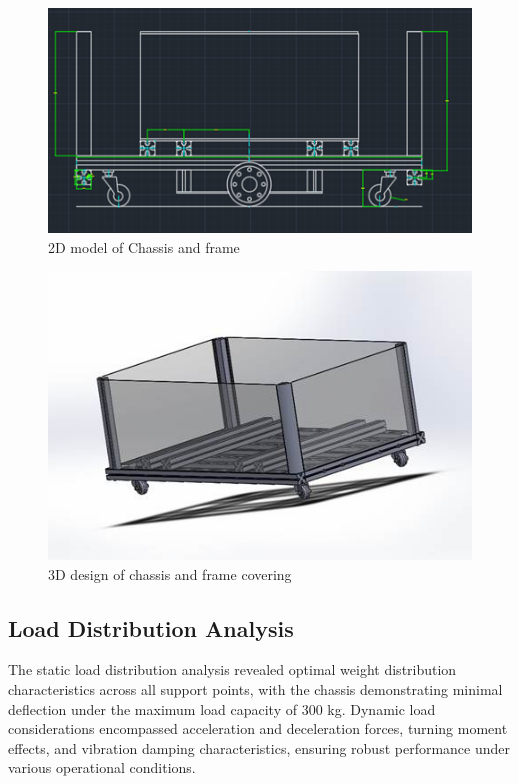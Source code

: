 \documentclass[../../main]{subfiles}
\begin{document}
\begin{figure}[h!]
\centering
\includegraphics[width=\textwidth]{img/image118.png}
\caption{2D model of Chassis and frame}
\end{figure}

\begin{figure}[h!]
  \centering
  \includegraphics[width=\textwidth]{img/image120.jpg}
  \caption{3D design of chassis and frame covering}
  \end{figure}

\subsection{Load Distribution
Analysis}\label{load-distribution-analysis}

The static load distribution analysis revealed optimal weight
distribution characteristics across all support points, with the chassis
demonstrating minimal deflection under the maximum load capacity of 300
kg. Dynamic load considerations encompassed acceleration and
deceleration forces, turning moment effects, and vibration damping
characteristics, ensuring robust performance under various operational
conditions.
\end{document}

